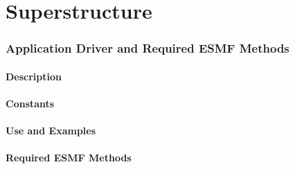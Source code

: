 \documentclass[english]{article}
\begin{document}
\part{Superstructure}
\label{part:Superstructure}
\newpage

%
\section{Application Driver and Required ESMF Methods}
\subsection{Description}

\subsection{Constants}

\subsection{Use and Examples}


%
%
\subsection{Required ESMF Methods}



%
\end{document}
